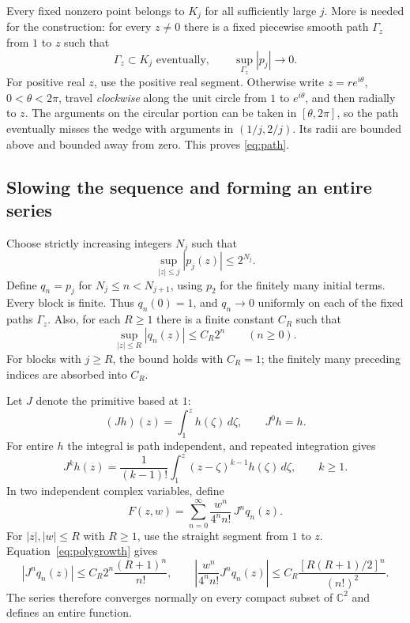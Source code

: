 \documentclass[11pt,reqno]{amsart}
\numberwithin{equation}{section}
\theoremstyle{definition}
\theoremstyle{remark}
\newcommand{\C}{\mathbb C}
\begin{document}
Every fixed nonzero point belongs to $K_j$ for all sufficiently large $j$. More is needed for the construction: for every $z\ne0$ there is a fixed piecewise smooth path $\Gamma_z$ from $1$ to $z$ such that
\begin{equation}\label{eq:path}
 \Gamma_z\subset K_j\text{ eventually},\qquad
 \sup_{\Gamma_z}|p_j|\longrightarrow0.
\end{equation}
For positive real $z$, use the positive real segment. Otherwise write $z=re^{i\theta}$, $0<\theta<2\pi$, travel \emph{clockwise} along the unit circle from $1$ to $e^{i\theta}$, and then radially to $z$. The arguments on the circular portion can be taken in $[\theta,2\pi]$, so the path eventually misses the wedge with arguments in $(1/j,2/j)$. Its radii are bounded above and bounded away from zero. This proves \eqref{eq:path}.

\subsection{Slowing the sequence and forming an entire series}
Choose strictly increasing integers $N_j$ such that
\[
 \sup_{|z|\le j}|p_j(z)|\le2^{N_j}.
\]
Define $q_n=p_j$ for $N_j\le n<N_{j+1}$, using $p_2$ for the finitely many initial terms. Every block is finite. Thus $q_n(0)=1$, and $q_n\to0$ uniformly on each of the fixed paths $\Gamma_z$. Also, for each $R\ge1$ there is a finite constant $C_R$ such that
\begin{equation}\label{eq:polygrowth}
 \sup_{|z|\le R}|q_n(z)|\le C_R2^n\qquad(n\ge0).
\end{equation}
For blocks with $j\ge R$, the bound holds with $C_R=1$; the finitely many preceding indices are absorbed into $C_R$.

Let $J$ denote the primitive based at $1$:
\[
 (Jh)(z)=\int_1^z h(\zeta)\,d\zeta,\qquad J^0h=h.
\]
For entire $h$ the integral is path independent, and repeated integration gives
\begin{equation}\label{eq:primitive}
 J^kh(z)=\frac1{(k-1)!}\int_1^z(z-\zeta)^{k-1}h(\zeta)\,d\zeta,
 \qquad k\ge1.
\end{equation}
In two independent complex variables, define
\begin{equation}\label{eq:entireseries}
 F(z,w)=\sum_{n=0}^{\infty}\frac{w^n}{4^n n!}\,J^nq_n(z).
\end{equation}
For $|z|,|w|\le R$ with $R\ge1$, use the straight segment from $1$ to $z$. Equation~\eqref{eq:polygrowth} gives
\[
 |J^nq_n(z)|\le C_R2^n\frac{(R+1)^n}{n!},
 \qquad
 \left|\frac{w^n}{4^n n!}J^nq_n(z)\right|
 \le C_R\frac{[R(R+1)/2]^n}{(n!)^2}.
\]
The series therefore converges normally on every compact subset of $\C^2$ and defines an entire function.
\end{document}
